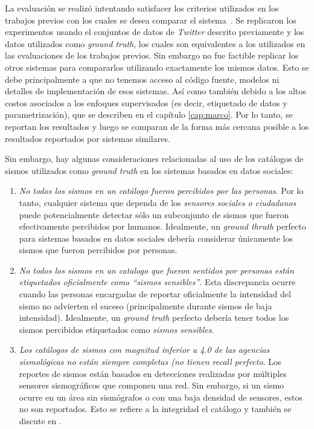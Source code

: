 La evaluación se realizó intentando satisfacer los criterios utilizados en los trabajos previos con los cuales se desea comparar el sistema~\cite{sakaki2010earthquake,avvenuti2014ears,robinson2013sensitive,earle2012twitter}. Se replicaron los experimentos usando el conjuntos de datos de \textit{Twitter} descrito previamente y los datos utilizados como \textit{ground truth}, los cuales son equivalentes a los utilizados en las evaluaciones de los trabajos previos. Sin embargo no fue factible replicar los otros sistemas para compararlos utilizando exactamente los mismos datos. Esto se debe principalmente a que no tenemos acceso al código fuente, modelos ni detalles de implementación de esos sistemas. Así como también debido a los altos costos asociados a los enfoques supervisados (es decir, etiquetado de datos y parametrización), que se describen en el capítulo \ref{cap:marco}. Por lo tanto, se reportan los resultados y luego se comparan de la forma más cercana posible a los resultados reportados por sistemas similares.

Sin embargo, hay algunas consideraciones relacionadas al uso de los catálogos de sismos utilizados como \textit{ground truth} en los sistemas basados en datos sociales:

\begin{enumerate}
\item  \textit{No todos los sismos en un catálogo fueron percibidos por las personas}. Por lo tanto, cualquier sistema que dependa de los \textit{sensores sociales o ciudadanos} puede potencialmente detectar sólo  un subconjunto de sismos que fueron efectivamente percibidos por humanos. Idealmente, un \textit{ground thruth} perfecto para sistemas basados en datos sociales debería considerar únicamente los sismos que fueron percibidos por personas. 
\item \textit{No todos los sismos en un catalogo que fueron sentidos por personas están etiquetados oficialmente como ``sismos sensibles''}. Esta discrepancia ocurre cuando las personas encargadas de reportar oficialmente la intensidad del sismo no advierten el suceso (principalmente durante sismos de baja intensidad). Idealmente, un \textit{ground truth} perfecto debería tener todos los sismos percibidos etiquetados como \textit{sismos sensibles}. 
\item \textit{Los catálogos de sismos con magnitud inferior a 4.0 de las agencias sismológicas no están siempre completas (no tienen \textit{recall} perfecto}. Los reportes de sismos están basados en detecciones realizadas por múltiples sensores sismográficos que componen una red. Sin embargo, si un sismo ocurre en un área sin sismógrafos o con una baja densidad de sensores, estos no son reportados. Esto se refiere a la integridad el catálogo y también se discute en \cite{earle2010omg}. 
\end{enumerate}

